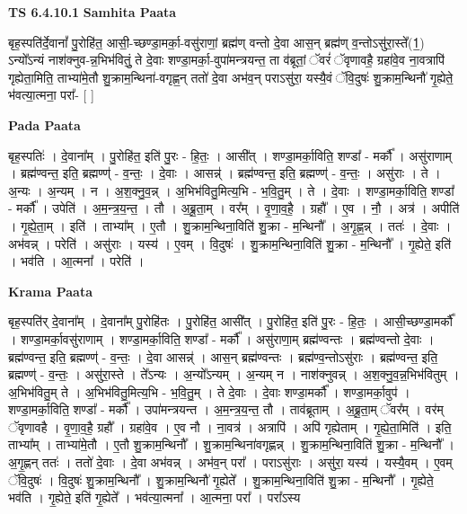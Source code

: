 \documentclass[17pt]{extarticle}
\begin{document}
\textbf{TS 6.4.10.1 } \newline
\textbf{Samhita Paata} \newline

बृह॒स्पति॑र्दे॒वानां᳚ पु॒रोहि॑त॒ आसी॒-च्छण्डा॒मर्का॒-वसु॑राणां॒ ब्रह्म॑ण् वन्तो दे॒वा आस॒न् ब्रह्म॑ण् व॒न्तोऽसु॑रा॒स्ते᳚(1॒) ऽन्यो᳚ऽन्यं नाश॑क्नुव-न्न॒भिभ॑वितुं॒ ते दे॒वाः शण्डा॒मर्का॒-वुपा॑मन्त्रयन्त॒ ता व॑ब्रूतां॒ ॅवरं॑ ॅवृणावहै॒ ग्रहा॑वे॒व ना॒वत्रापि॑ गृह्येता॒मिति॒ ताभ्या॑मे॒तौ शु॒क्राम॒न्थिना॑-वगृह्ण॒न् ततो॑ दे॒वा अभ॑व॒न् पराऽसु॑रा॒ यस्यै॒वं ॅवि॒दुषः॑ शु॒क्राम॒न्थिनौ॑ गृ॒ह्येते॒ भ॑वत्या॒त्मना॒ परा᳚- [  ] \newline

\textbf{Pada Paata} \newline

बृह॒स्पतिः॑ । दे॒वाना᳚म् । पु॒रोहि॑त॒ इति॑ पु॒रः - हि॒तः॒ । आसी᳚त् । शण्डा॒मर्का॒विति॒ शण्डा᳚ - मर्कौ᳚ । असु॑राणाम् । ब्रह्म॑ण्वन्त॒ इति॒ ब्रह्मण्ण्॑ - व॒न्तः॒ । दे॒वाः । आसन्न्॑ । ब्रह्म॑ण्वन्त॒ इति॒ ब्रह्मण्ण्॑ - व॒न्तः॒ । असु॑राः । ते । अ॒न्यः । अ॒न्यम् । न । अ॒श॒क्नु॒व॒न्न् । अ॒भिभ॑वितु॒मित्य॒भि - भ॒वि॒तु॒म् । ते । दे॒वाः । शण्डा॒मर्का॒विति॒ शण्डा᳚ - मर्कौ᳚ । उपेति॑ । अ॒म॒न्त्र॒य॒न्त॒ । तौ । अ॒ब्रू॒ता॒म् । वर᳚म् । वृ॒णा॒व॒है॒ । ग्रहौ᳚ । ए॒व । नौ॒ । अत्र॑ । अपीति॑ । गृ॒ह्ये॒ता॒म् । इति॑ । ताभ्या᳚म् । ए॒तौ । शु॒क्राम॒न्थिना॒विति॑ शु॒क्रा - म॒न्थिनौ᳚ । अ॒गृ॒ह्ण॒न्न् । ततः॑ । दे॒वाः । अभ॑वन्न् । परेति॑ । असु॑राः । यस्य॑ । ए॒वम् । वि॒दुषः॑ । शु॒क्राम॒न्थिना॒विति॑ शु॒क्रा - म॒न्थिनौ᳚ । गृ॒ह्येते॒ इति॑ । भव॑ति । आ॒त्मना᳚ । परेति॑ ।  \newline


\textbf{Krama Paata} \newline

बृह॒स्पति॑र् दे॒वाना᳚म् । दे॒वाना᳚म् पु॒रोहि॑तः । पु॒रोहि॑त॒ आसी᳚त् । पु॒रोहि॑त॒ इति॑ पु॒रः - हि॒तः॒ । आसी॒च्छण्डा॒मर्कौ᳚ । शण्डा॒मर्का॒वसु॑राणाम् । शण्डा॒मर्का॒विति॒ शण्डा᳚ - मर्कौ᳚ । असु॑राणा॒म् ब्रह्म॑ण्वन्तः । ब्रह्म॑ण्वन्तो दे॒वाः । ब्रह्म॑ण्वन्त॒ इति॒ ब्रह्मण्ण्॑ - व॒न्तः॒ । दे॒वा आसन्न्॑ । आस॒न् ब्रह्म॑ण्वन्तः । ब्रह्म॑ण्व॒न्तोऽसु॑राः । ब्रह्म॑ण्वन्त॒ इति॒ ब्रह्मण्ण्॑ - व॒न्तः॒ । असु॑रा॒स्ते । ते᳚ऽन्यः । अ॒न्यो᳚ऽन्यम् । अ॒न्यम् न । नाश॑क्नुवन्न् । अ॒श॒क्नु॒व॒न्न॒भिभ॑वितुम् । अ॒भिभ॑वितु॒म् ते । अ॒भिभ॑वितु॒मित्य॒भि - भ॒वि॒तु॒म् । ते दे॒वाः । दे॒वाः शण्डा॒मर्कौ᳚ । शण्डा॒मर्का॒वुप॑ । शण्डा॒मर्का॒विति॒ शण्डा᳚ - मर्कौ᳚ । उपा॑मन्त्रयन्त । अ॒म॒न्त्र॒य॒न्त॒ तौ । ताव॑ब्रूताम् । अ॒ब्रू॒ता॒म् ॅवर᳚म् । वर॑म् ॅवृणावहै । वृ॒णा॒व॒है॒ ग्रहौ᳚ । ग्रहा॑वे॒व । ए॒व नौ । ना॒वत्र॑ । अत्रापि॑ । अपि॑ गृह्येताम् । गृ॒ह्ये॒ता॒मिति॑ । इति॒ ताभ्या᳚म् । ताभ्या॑मे॒तौ । ए॒तौ शु॒क्राम॒न्थिनौ᳚ । शु॒क्राम॒न्थिना॑वगृह्णन्न् । शु॒क्राम॒न्थिना॒विति॑ शु॒क्रा - म॒न्थिनौ᳚ । अ॒गृ॒ह्णन् ततः॑ । ततो॑ दे॒वाः । दे॒वा अभ॑वन्न् । अभ॑व॒न् परा᳚ । पराऽसु॑राः । असु॑रा॒ यस्य॑ । यस्यै॒वम् । ए॒वम् ॅवि॒दुषः॑ । वि॒दुषः॑ शु॒क्राम॒न्थिनौ᳚ । शु॒क्राम॒न्थिनौ॑ गृ॒ह्येते᳚ । शु॒क्राम॒न्थिना॒विति॑ शु॒क्रा - म॒न्थिनौ᳚ । गृ॒ह्येते॒ भव॑ति । गृ॒ह्येते॒ इति॑ गृ॒ह्येते᳚ । भव॑त्या॒त्मना᳚ । आ॒त्मना॒ परा᳚ । परा᳚ऽस्य \newline
\end{document}
